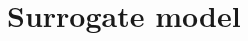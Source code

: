 \documentclass[prd,aps,letter,twocolumn,floatfix,notitlepage,nofootinbib]{revtex4-1}
\def\bx{\mathbf{x}}
\begin{document}
\section{Surrogate model}

\end{document}
